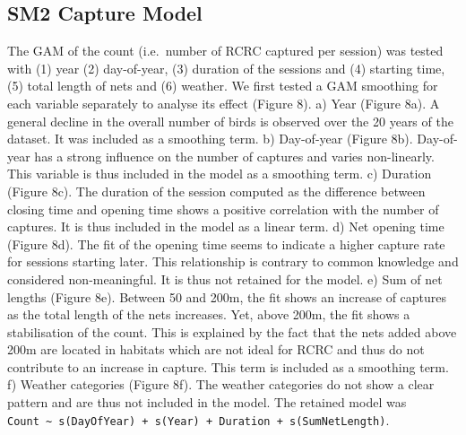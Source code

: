 \documentclass[]{interact}
\theoremstyle{plain}%
\theoremstyle{definition}
\theoremstyle{remark}
\begin{document}
\hypertarget{sm2-capture-model}{%
\subsection{SM2 Capture Model}\label{sm2-capture-model}}

The GAM of the count (i.e.~number of RCRC captured per session) was
tested with (1) year (2) day-of-year, (3) duration of the sessions and
(4) starting time, (5) total length of nets and (6) weather. We first
tested a GAM smoothing for each variable separately to analyse its
effect (Figure 8). a) Year (Figure 8a). A general decline in the overall
number of birds is observed over the 20 years of the dataset. It was
included as a smoothing term. b) Day-of-year (Figure 8b). Day-of-year
has a strong influence on the number of captures and varies
non-linearly. This variable is thus included in the model as a smoothing
term. c) Duration (Figure 8c). The duration of the session computed as
the difference between closing time and opening time shows a positive
correlation with the number of captures. It is thus included in the
model as a linear term. d) Net opening time (Figure 8d). The fit of the
opening time seems to indicate a higher capture rate for sessions
starting later. This relationship is contrary to common knowledge and
considered non-meaningful. It is thus not retained for the model. e) Sum
of net lengths (Figure 8e). Between 50 and 200m, the fit shows an
increase of captures as the total length of the nets increases. Yet,
above 200m, the fit shows a stabilisation of the count. This is
explained by the fact that the nets added above 200m are located in
habitats which are not ideal for RCRC and thus do not contribute to an
increase in capture. This term is included as a smoothing term. f)
Weather categories (Figure 8f). The weather categories do not show a
clear pattern and are thus not included in the model. The retained model
was
\texttt{Count\ \textasciitilde{}\ s(DayOfYear)\ +\ s(Year)\ +\ Duration\ +\ s(SumNetLength)}.
\end{document}
